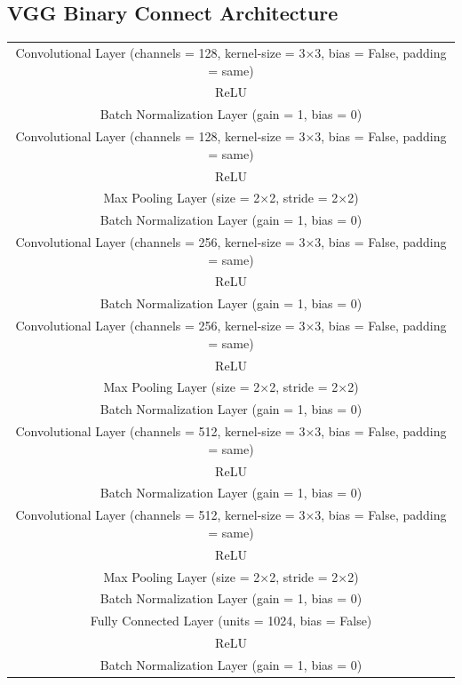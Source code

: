 \subsection*{VGG Binary Connect Architecture}
\begin{table}[h!]
\begin{center}
\begin{tabular}{ c }
\hline
   Convolutional Layer (channels = 128, kernel-size = 3×3, bias = False, padding = same)\\ 
   ReLU \\
   Batch Normalization Layer (gain = 1, bias = 0)  \\
   Convolutional Layer (channels = 128, kernel-size = 3×3, bias = False, padding = same) \\ 
   ReLU \\
   Max Pooling Layer (size = 2×2, stride = 2×2)  \\
   Batch Normalization Layer (gain = 1, bias = 0) \\ \hline
   Convolutional Layer (channels = 256, kernel-size = 3×3, bias = False, padding = same)\\ 
   ReLU \\
   Batch Normalization Layer (gain = 1, bias = 0)  \\
   Convolutional Layer (channels = 256, kernel-size = 3×3, bias = False, padding = same) \\ 
   ReLU \\
   Max Pooling Layer (size = 2×2, stride = 2×2)  \\
   Batch Normalization Layer (gain = 1, bias = 0)  \\ \hline
   Convolutional Layer (channels = 512, kernel-size = 3×3, bias = False, padding = same) \\ 
   ReLU  \\
   Batch Normalization Layer (gain = 1, bias = 0) \\
   Convolutional Layer (channels = 512, kernel-size = 3×3, bias = False, padding = same) \\ 
   ReLU \\
   Max Pooling Layer (size = 2×2, stride = 2×2) \\
   Batch Normalization Layer (gain = 1, bias = 0)  \\ \hline
   Fully Connected Layer (units = 1024, bias = False) \\      
   ReLU \\      
   Batch Normalization Layer (gain = 1, bias = 0)  \\ \hline

\end{tabular}
\end{center}
\end{table}
